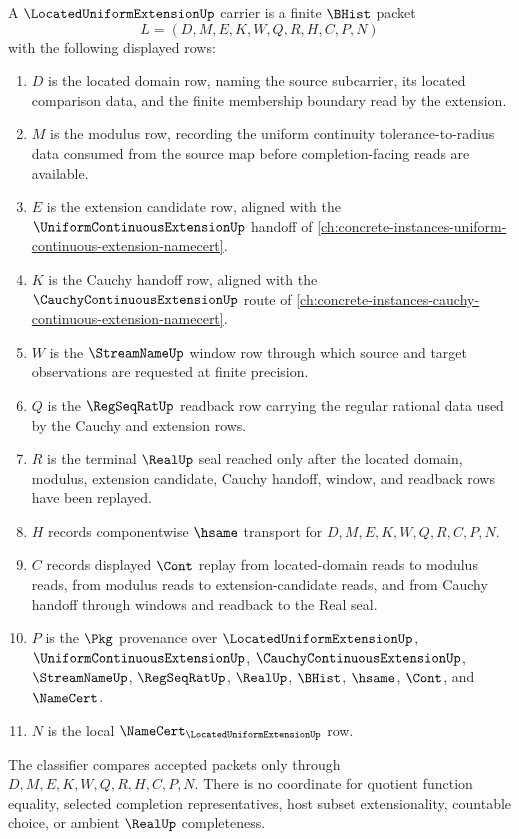 \begin{definition}
\label{def:located-uniform-extension-carrier}
A $\LocatedUniformExtensionUp$ carrier is a finite $\BHist$ packet
$$
L=(D,M,E,K,W,Q,R,H,C,P,N)
$$
with the following displayed rows:
\begin{enumerate}
\item $D$ is the located domain row, naming the source subcarrier, its located comparison data, and the finite membership boundary read by the extension.
\item $M$ is the modulus row, recording the uniform continuity tolerance-to-radius data consumed from the source map before completion-facing reads are available.
\item $E$ is the extension candidate row, aligned with the $\UniformContinuousExtensionUp$ handoff of \autoref{ch:concrete-instances-uniform-continuous-extension-namecert}.
\item $K$ is the Cauchy handoff row, aligned with the $\CauchyContinuousExtensionUp$ route of \autoref{ch:concrete-instances-cauchy-continuous-extension-namecert}.
\item $W$ is the $\StreamNameUp$ window row through which source and target observations are requested at finite precision.
\item $Q$ is the $\RegSeqRatUp$ readback row carrying the regular rational data used by the Cauchy and extension rows.
\item $R$ is the terminal $\RealUp$ seal reached only after the located domain, modulus, extension candidate, Cauchy handoff, window, and readback rows have been replayed.
\item $H$ records componentwise $\hsame$ transport for $D,M,E,K,W,Q,R,C,P,N$.
\item $C$ records displayed $\Cont$ replay from located-domain reads to modulus reads, from modulus reads to extension-candidate reads, and from Cauchy handoff through windows and readback to the Real seal.
\item $P$ is the $\Pkg$ provenance over $\LocatedUniformExtensionUp$, $\UniformContinuousExtensionUp$, $\CauchyContinuousExtensionUp$, $\StreamNameUp$, $\RegSeqRatUp$, $\RealUp$, $\BHist$, $\hsame$, $\Cont$, and $\NameCert$.
\item $N$ is the local $\NameCert_{\LocatedUniformExtensionUp}$ row.
\end{enumerate}
The classifier compares accepted packets only through $D,M,E,K,W,Q,R,H,C,P,N$. There is no coordinate for quotient function equality, selected completion representatives, host subset extensionality, countable choice, or ambient $\RealUp$ completeness.
\end{definition}

